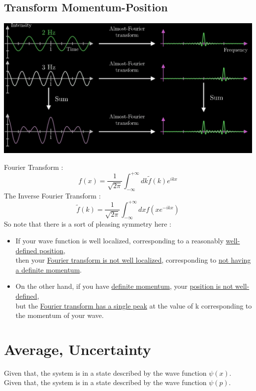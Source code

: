 \documentclass[12pt,oneside]{book}
\begin{document}
\subsection{Transform Momentum-Position}
\begin{center}
	\includegraphics[width=0.7\linewidth]{../pic/3302/14.png}
\end{center}
Fourier Transform :
\[  \boxed{f(x) = \frac{1}{\sqrt{2\pi}}\int^{+\infty}_{-\infty}dk \widetilde{f}(k)e^{ikx}}   \]
The Inverse Fourier Transform :
\[ \boxed{\widetilde{f}(k)=\frac{1}{\sqrt{2\pi}} \int^{+\infty}_{-\infty} dx f(x e^{-ikx})} \]
So note that there is a sort of pleasing symmetry here :
\begin{center}
	\begin{itemize}
		\item If your wave function is well localized, corresponding to a reasonably \underline{well-defined position},\\then your \underline{Fourier transform is not well localized}, corresponding to \underline{not having a definite momentum}.
		\item On the other hand, if you have \underline{definite momentum}, your \underline{position is not well-defined},\\but the \underline{Fourier transform has a single peak} at the value of k corresponding to the momentum of your wave.
	\end{itemize}
\end{center}
\section{Average, Uncertainty}
Given that, the system is in a state described by the wave function $\psi(x)$.\\
Given that, the system is in a state described by the wave function $\psi(p)$.\\
\end{document}
